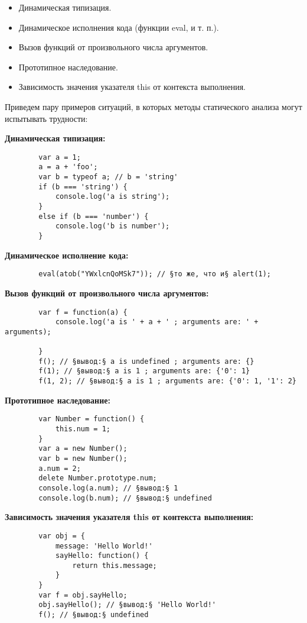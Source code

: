	\begin{itemize}
		\item Динамическая типизация.
		\item Динамическое исполнения кода (функции eval, и т. п.).
		\item Вызов функций от произвольного числа аргументов.
		\item Прототипное наследование.
		\item Зависимость значения указателя this от контекста выполнения.
	\end{itemize}
	\bigskip

	Приведем пару примеров ситуаций, в которых методы статического анализа могут испытывать трудности:


	\bigskip
	\textbf{Динамическая типизация:}
	\begin{lstlisting}
		var a = 1;
		a = a + 'foo';
		var b = typeof a; // b = 'string'
		if (b === 'string') {
			console.log('a is string');
		}
		else if (b === 'number') {
			console.log('b is number');
		}
	\end{lstlisting}

	\bigskip
	\textbf{Динамическое исполнение кода:}
	\begin{lstlisting}
		eval(atob("YWxlcnQoMSk7")); // §то же, что и§ alert(1);
	\end{lstlisting}

	\bigskip
	\textbf{Вызов функций от произвольного числа аргументов:}
	\begin{lstlisting}
		var f = function(a) {
			console.log('a is ' + a + ' ; arguments are: ' + arguments);
			
		}
		f(); // §вывод:§ a is undefined ; arguments are: {}
		f(1); // §вывод:§ a is 1 ; arguments are: {'0': 1}
		f(1, 2); // §вывод:§ a is 1 ; arguments are: {'0': 1, '1': 2}
	\end{lstlisting}		

	\bigskip
	\textbf{Прототипное наследование:}
	\begin{lstlisting}
		var Number = function() {
			this.num = 1;
		}
		var a = new Number();
		var b = new Number();
		a.num = 2;
		delete Number.prototype.num;
		console.log(a.num); // §вывод:§ 1
		console.log(b.num); // §вывод:§ undefined
	\end{lstlisting}	

	\bigskip
	\textbf{Зависимость значения указателя this от контекста выполнения:}
	\begin{lstlisting}
		var obj = {
			message: 'Hello World!'
			sayHello: function() {
				return this.message;
			}
		}
		var f = obj.sayHello;
		obj.sayHello(); // §вывод:§ 'Hello World!'
		f(); // §вывод:§ undefined
	\end{lstlisting}	


